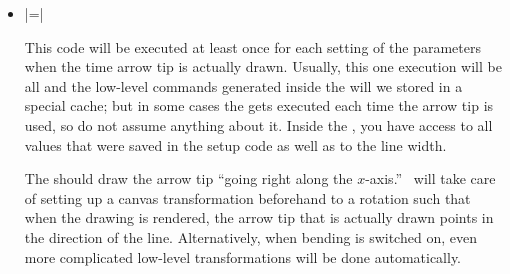 \begin{command}{\pgfdeclarearrow{}}
\begin{itemize}
    \begin{command}{\pgfarrowssave{}}
      As explained earlier, the setup code needs to ``communicate''
      with the drawing code via ``saved values.'' This command get the
      name of a macro and will store the value this macro had
      internally. Then, each time drawing code is executed, the value
      of this macro will be restored.
    \end{command}

    \begin{command}{\pgfarrowssavethe{}}
      Works like |\pgfarrowssave|, only the parameter must be a
      register and the value |\the| will be saved.
      Typically, you will write something like
\begin{codeexample}
\pgfarrowssavethe{\pgfarrowlength}
\pgfarrowssavethe{\pgfarrowwidth}
\end{codeexample}
      To ensure that inside the drawing code the the dimension
      registers |\pgfarrowlength| and |\pgfarrowwidth| are setup with
      the values they had during the setup.
    \end{command}
    
  \item {}|=|

    This code will be executed at least once for each setting of the
    parameters when the time arrow tip is actually drawn. Usually,
    this one execution will be all and the 
    low-level commands generated inside the  will we stored
    in a special cache; but in some cases the  gets
    executed each time the arrow tip is used, so do not assume
    anything about it. Inside the , you have access to all
    values that were saved in the setup code as well as to the line
    width.
    
    The  should draw the arrow tip ``going right along the
    $x$-axis.'' \pgfname\ will take care of setting up a  canvas
    transformation beforehand to a rotation such that when the
    drawing is rendered, the arrow tip that is  actually drawn points
    in the direction of the line. Alternatively, when bending is
    switched on, even more complicated low-level transformations will
    be done automatically.
    

\end{itemize}
\end{command}
